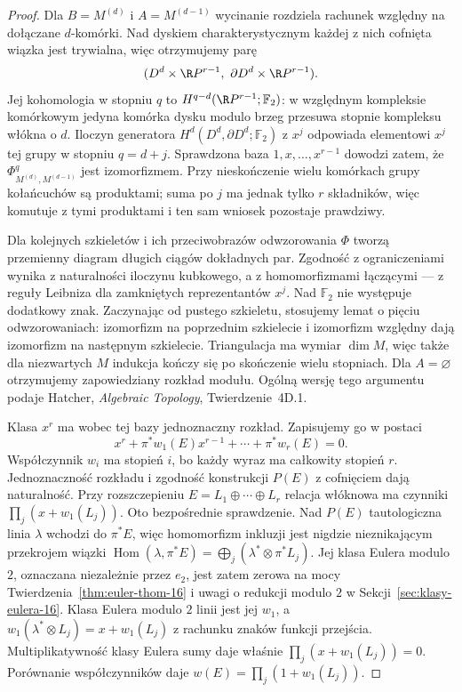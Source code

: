 \begin{proof}
Dla $B=M^{(d)}$ i $A=M^{(d-1)}$ wycinanie rozdziela rachunek względny
na dołączane $d$-komórki. Nad dyskiem charakterystycznym każdej
z nich cofnięta wiązka jest trywialna, więc otrzymujemy parę
\[
 (D^d\times\R P^{r-1},\ \partial D^d\times\R P^{r-1}).
\]
Jej kohomologia w stopniu $q$ to $H^{q-d}(\R P^{r-1};\mathbb F_2)$:
w względnym kompleksie komórkowym jedyna komórka dysku modulo
brzeg przesuwa stopnie kompleksu włókna o $d$.
Iloczyn generatora $H^d(D^d,\partial D^d;\mathbb F_2)$ z $x^j$
odpowiada elementowi $x^j$ tej grupy w stopniu $q=d+j$.
Sprawdzona baza $1,x,\ldots,x^{r-1}$ dowodzi zatem, że
$\Phi^q_{M^{(d)},M^{(d-1)}}$ jest izomorfizmem.
Przy nieskończenie wielu komórkach grupy kołańcuchów są produktami;
suma po $j$ ma jednak tylko $r$ składników, więc komutuje z tymi
produktami i ten sam wniosek pozostaje prawdziwy.

Dla kolejnych szkieletów i ich przeciwobrazów odwzorowania $\Phi$
tworzą przemienny diagram długich ciągów dokładnych par.
Zgodność z ograniczeniami wynika z naturalności iloczynu kubkowego,
a z homomorfizmami łączącymi --- z reguły Leibniza dla zamkniętych
reprezentantów $x^j$. Nad $\mathbb F_2$ nie występuje dodatkowy znak.
Zaczynając od pustego szkieletu, stosujemy lemat o pięciu
odwzorowaniach: izomorfizm na poprzednim szkielecie i izomorfizm
względny dają izomorfizm na następnym szkielecie.
Triangulacja ma wymiar $\dim M$, więc także dla niezwartych $M$
indukcja kończy się po skończenie wielu stopniach. Dla $A=\varnothing$
otrzymujemy zapowiedziany rozkład modułu. Ogólną wersję tego argumentu
podaje Hatcher, \emph{Algebraic Topology}, Twierdzenie~4D.1.

Klasa $x^r$ ma wobec
tej bazy jednoznaczny
rozkład. Zapisujemy
go w postaci
\[
 x^r+
   \pi^*w_1(E)x^{r-1}
     +\cdots+\pi^*w_r(E)=0.
\]
Współczynnik $w_i$
ma stopień $i$,
bo każdy wyraz ma
całkowity stopień $r$.
Jednoznaczność rozkładu
i zgodność konstrukcji
$P(E)$ z cofnięciem
dają naturalność.
Przy rozszczepieniu
$E=L_1\oplus\cdots\oplus L_r$
relacja włóknowa
ma czynniki
$\prod_j(x+w_1(L_j))$.
Oto bezpośrednie
sprawdzenie. Nad $P(E)$
tautologiczna linia
$\lambda$ wchodzi
do $\pi^*E$, więc
homomorfizm inkluzji
jest nigdzie
nieznikającym
przekrojem wiązki
$\operatorname{Hom}(\lambda,\pi^*E)
=\bigoplus_j(\lambda^*\otimes\pi^*L_j)$.
Jej klasa Eulera modulo $2$, oznaczana niezależnie
przez $e_2$, jest zatem zerowa
na mocy
Twierdzenia~\ref{thm:euler-thom-16}
i uwagi o redukcji
modulo $2$ w
Sekcji~\ref{sec:klasy-eulera-16}.
Klasa Eulera modulo $2$
linii jest jej
$w_1$, a
$w_1(\lambda^*\otimes L_j)
=x+w_1(L_j)$
z rachunku znaków
funkcji przejścia.
Multiplikatywność
klasy Eulera sumy
daje właśnie
$\prod_j(x+w_1(L_j))=0$.
Porównanie współczynników
daje
$w(E)=\prod_j(1+w_1(L_j))$.


\end{proof}
